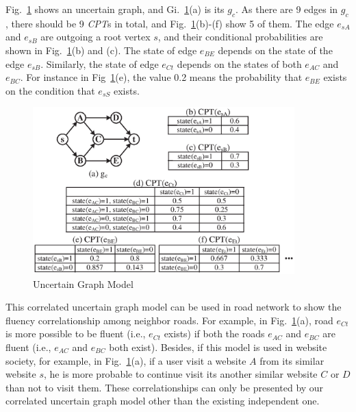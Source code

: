 \documentclass[runningheads,a4paper]{llncs}
\begin{document}
\vspace{-0.2cm}
\begin{example}
\label{eg:model}
Fig.~\ref{fig:CPT} shows an uncertain graph, and Gi.~\ref{fig:CPT}(a) is its $g_c$. As there are 9 edges in $g_c$, there should be 9 \emph{CPT}s in total, and Fig.~\ref{fig:CPT}(b)-(f) show 5 of them. The edge $e_{sA}$ and $e_{sB}$ are outgoing a root vertex $s$, and their conditional probabilities are shown in Fig.~\ref{fig:CPT}(b) and (c). The state of edge $e_{BE}$ depends on the state of the edge $e_{sB}$. Similarly, the state of edge $e_{Ct}$ depends on the states of both $e_{AC}$ and $e_{BC}$. For instance in Fig~\ref{fig:CPT}(e), the value 0.2 means the probability that $e_{BE}$ exists on the condition that $e_{sS}$ exists.

\begin{figure}[htbp]
\vspace{-0.6cm}
\label{fig:CPT}
\centering
\includegraphics[width=0.9\textwidth]{fig-cpt.eps}
\vspace{-0.3cm}
\caption{\small{Uncertain Graph Model}}
\vspace{-0.4cm}
\end{figure}

\vspace{-0.3cm}
\end{example}

This correlated uncertain graph model can be used in road network to show the fluency correlationship among neighbor roads. For example, in Fig.~\ref{fig:CPT}(a), road $e_{Ct}$ is more possible to be fluent (i.e., $e_{Ct}$ exists) if both the roads $e_{AC}$ and $e_{BC}$ are fluent (i.e., $e_{AC}$ and $e_{BC}$ both exist). Besides, if this model is used in website society, for example, in Fig.~\ref{fig:CPT}(a), if a user visit a website $A$ from its similar website $s$, he is more probable to continue visit its another similar website $C$ or $D$ than not to visit them. These correlationships can only be presented by our correlated uncertain graph model other than the existing independent one.
\end{document}
